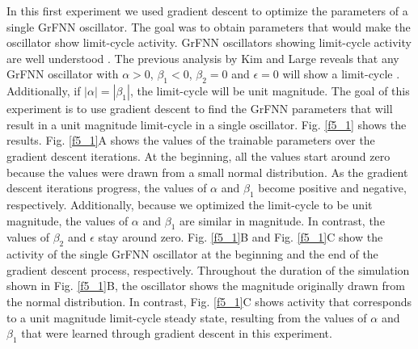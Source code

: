 \documentclass{report}
\begin{document}
In this first experiment we used gradient descent to optimize the parameters of a single GrFNN oscillator. The goal was to obtain parameters that would make the oscillator show limit-cycle activity. GrFNN oscillators showing limit-cycle activity are well understood \cite{kim2015signal}. The previous analysis by Kim and Large reveals that any GrFNN oscillator with $\alpha>0$, $\beta_1<0$, $\beta_2=0$ and $\epsilon=0$ will show a limit-cycle \cite{kim2015signal}. Additionally, if $|\alpha|=|\beta_1|$, the limit-cycle will be unit magnitude. The goal of this experiment is to use gradient descent to find the GrFNN parameters that will result in a unit magnitude limit-cycle in a single oscillator. Fig.{} \ref{f5_1} shows the results. Fig.{} \ref{f5_1}A shows the values of the trainable parameters over the gradient descent iterations. At the beginning, all the values start around zero because the values were drawn from a small normal distribution. As the gradient descent iterations progress, the values of $\alpha$ and $\beta_1$ become positive and negative, respectively. Additionally, because we optimized the limit-cycle to be unit magnitude, the values of $\alpha$ and $\beta_1$ are similar in magnitude. In contrast, the values of $\beta_2$ and $\epsilon$ stay around zero. Fig.{} \ref{f5_1}B and Fig.{} \ref{f5_1}C show the activity of the single GrFNN oscillator at the beginning and the end of the gradient descent process, respectively. Throughout the duration of the simulation shown in Fig.{} \ref{f5_1}B, the oscillator shows the magnitude originally drawn from the normal distribution. In contrast, Fig.{} \ref{f5_1}C shows activity that corresponds to a unit magnitude limit-cycle steady state, resulting from the values of $\alpha$ and $\beta_1$ that were learned through gradient descent in this experiment. 
\end{document}
